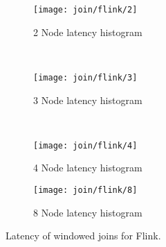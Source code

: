 \begin{figure*}
    \centering
    \begin{subfigure}[b]{0.49\textwidth}
        \texttt{[image: join/flink/2]}
        \caption{2 Node latency histogram}
        \label{fig_no_queue}
    \end{subfigure}
    ~ %
    \begin{subfigure}[b]{0.49\textwidth}
        \texttt{[image: join/flink/3]}
        \caption{3 Node latency histogram}
        \label{fig_yes_queue}
    \end{subfigure}
    ~ %
    \begin{subfigure}[b]{0.49\textwidth}
        \texttt{[image: join/flink/4]}
        \caption{4 Node latency histogram}
        \label{fig_partial_queue}
    \end{subfigure}
        \begin{subfigure}[b]{0.49\textwidth}
        \texttt{[image: join/flink/8]}
        \caption{8 Node latency histogram}
        \label{fig_partial_queue}
    \end{subfigure}



    \label{fig_flink_agg_1}
        \caption{Latency of windowed joins for Flink.}
\end{figure*}
